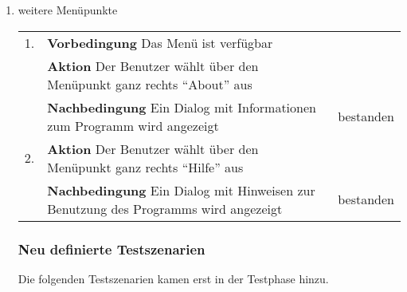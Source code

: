 \begin{enumerate} [label=\bfseries /TS \arabic*0/, leftmargin=*]
	\item weitere Menüpunkte \newline \newline
	\begin{tabular}{@{}rp{4in}|l}
	1. & \textbf{Vorbedingung} Das Menü ist verfügbar & \\
	   & \textbf{Aktion} Der Benutzer wählt über den Menüpunkt ganz rechts \enquote{About} aus & \\
	   & \textbf{Nachbedingung} Ein Dialog mit Informationen zum Programm wird angezeigt & bestanden \\
	\hline
	2. & \textbf{Aktion} Der Benutzer wählt über den Menüpunkt ganz rechts \enquote{Hilfe} aus & \\
	   & \textbf{Nachbedingung} Ein Dialog mit Hinweisen zur Benutzung des Programms wird angezeigt & bestanden \\
	\end{tabular}
	\newline

	\newpage
\subsubsection{Neu definierte Testszenarien}
	Die folgenden Testszenarien kamen erst in der Testphase hinzu.


\end{enumerate}
